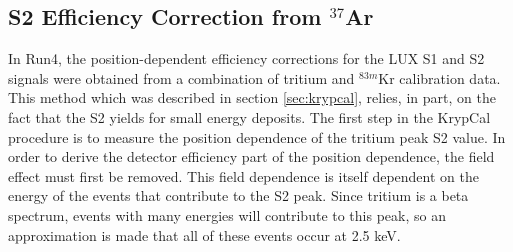 \subsection{S2 Efficiency Correction from $^{37}$Ar}
In Run4, the position-dependent efficiency corrections for the LUX S1 and S2 signals were obtained from a combination of tritium and $^{83m}$Kr calibration data. This method which was described in section \ref{sec:krypcal}, relies, in part, on the fact that the S2 yields for small energy deposits. The first step in the KrypCal procedure is to measure the position dependence of the tritium peak S2 value. In order to derive the detector efficiency part of the position dependence, the field effect must first be removed. This field dependence is itself dependent on the energy of the events that contribute to the S2 peak. Since tritium is a beta spectrum, events with many energies will contribute to this peak, so an approximation is made that all of these events occur at 2.5 keV.

